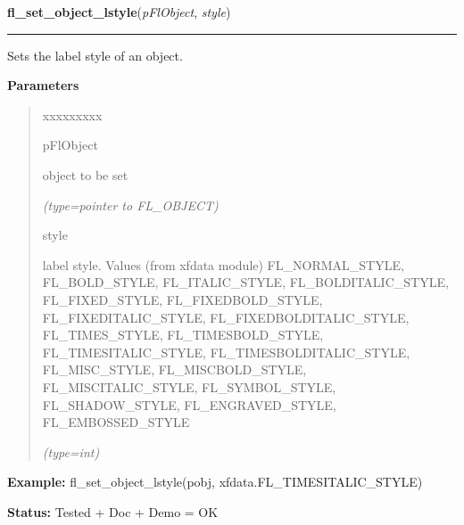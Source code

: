 \hspace{.8\funcindent}\begin{boxedminipage}{\funcwidth}

    \raggedright \textbf{fl\_set\_object\_lstyle}(\textit{pFlObject}, \textit{style})

    \vspace{-1.5ex}

    \rule{\textwidth}{0.5\fboxrule}
\setlength{\parskip}{2ex}
    Sets the label style of an object.

\setlength{\parskip}{1ex}
      \textbf{Parameters}
      \vspace{-1ex}

      \begin{quote}
        \begin{Ventry}{xxxxxxxxx}

          \item[pFlObject]

          object to be set

            {\it (type=pointer to FL\_OBJECT)}

          \item[style]

          label style. Values (from xfdata module) FL\_NORMAL\_STYLE, 
          FL\_BOLD\_STYLE, FL\_ITALIC\_STYLE, FL\_BOLDITALIC\_STYLE, 
          FL\_FIXED\_STYLE, FL\_FIXEDBOLD\_STYLE, FL\_FIXEDITALIC\_STYLE, 
          FL\_FIXEDBOLDITALIC\_STYLE, FL\_TIMES\_STYLE, 
          FL\_TIMESBOLD\_STYLE, FL\_TIMESITALIC\_STYLE, 
          FL\_TIMESBOLDITALIC\_STYLE, FL\_MISC\_STYLE, FL\_MISCBOLD\_STYLE,
          FL\_MISCITALIC\_STYLE, FL\_SYMBOL\_STYLE, FL\_SHADOW\_STYLE, 
          FL\_ENGRAVED\_STYLE, FL\_EMBOSSED\_STYLE

            {\it (type=int)}

        \end{Ventry}

      \end{quote}

\textbf{Example:} fl\_set\_object\_lstyle(pobj, xfdata.FL\_TIMESITALIC\_STYLE)



\textbf{Status:} Tested + Doc + Demo = OK



    \end{boxedminipage}

    \label{xformslib:flbasic:fl_get_object_lstyle}

